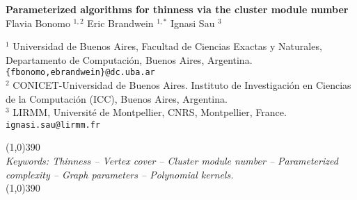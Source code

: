 \documentclass[12pt]{article}
\newcommand{\FPT}{\textsf{\textup{FPT}}}
\newcommand{\XP}{\textsf{\textup{XP}} }
\begin{document}
\pagestyle{empty}
\begin{center}
\Large
%
{\bf Parameterized algorithms for thinness via the cluster module number }\\[0.2in]
%
\large
%
Flavia Bonomo $^{1,2}$\hspace{.2cm}
%
%
Eric Brandwein $^{1,*}$\hspace{.2cm}
%
Ignasi Sau $^3$\hspace{.2cm}

%
$^1$ Universidad de Buenos Aires, Facultad de Ciencias Exactas y Naturales, Departamento de Computación, Buenos Aires, Argentina. \texttt{\{fbonomo,ebrandwein\}@dc.uba.ar} \\
%
$^2$ CONICET-Universidad de Buenos Aires. Instituto de Investigación en Ciencias de la
Computación (ICC), Buenos Aires, Argentina.\\
%
$^3$ LIRMM, Université de Montpellier, CNRS, Montpellier, France.
\texttt{ignasi.sau@lirmm.fr}\\

\end{center}
\normalsize
%
\line(1,0){390}\\
%
{\it Keywords: Thinness -- Vertex cover -- Cluster module number -- Parameterized complexity -- Graph parameters -- Polynomial kernels.}\\
%
\line(1,0){390}\\
%
\end{document}
